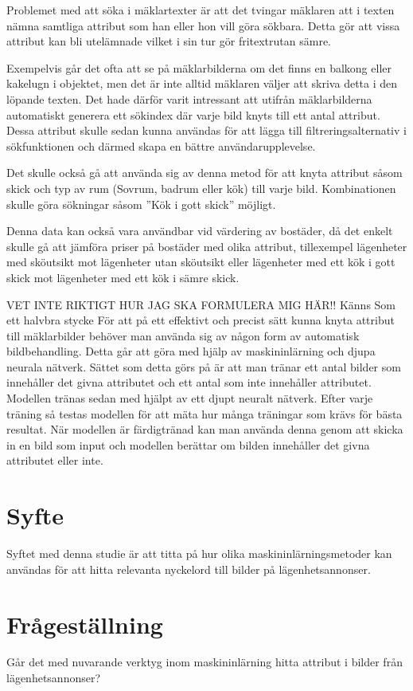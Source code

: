 \documentclass[]{kththesis}
\begin{document}
Problemet med att söka i mäklartexter är att det tvingar mäklaren att i texten nämna samtliga attribut som han eller hon vill göra sökbara. 
Detta gör att vissa attribut kan bli utelämnade vilket i sin tur gör fritextrutan sämre.

Exempelvis går det ofta att se på mäklarbilderna om det finns en balkong eller kakelugn i objektet, men det är inte alltid mäklaren väljer att skriva detta i den löpande texten.
Det hade därför varit intressant att utifrån mäklarbilderna automatiskt generera ett sökindex där varje bild knyts till ett antal attribut.
Dessa attribut skulle sedan kunna användas för att lägga till filtreringsalternativ i sökfunktionen och därmed skapa en bättre användarupplevelse.

Det skulle också gå att använda sig av denna metod för att knyta attribut såsom skick och typ av rum (Sovrum, badrum eller kök) till varje bild.
Kombinationen skulle göra sökningar såsom ”Kök i gott skick” möjligt.  

Denna data kan också vara användbar vid värdering av bostäder, då det enkelt skulle gå att jämföra priser på bostäder med olika attribut, tillexempel lägenheter med sköutsikt mot lägenheter utan sköutsikt eller lägenheter med ett kök i gott skick mot lägenheter med ett kök i sämre skick.

VET INTE RIKTIGT HUR JAG SKA FORMULERA MIG HÄR!! Känns Som ett halvbra stycke
För att på ett effektivt och precist sätt kunna knyta attribut till mäklarbilder behöver man använda sig av någon form av automatisk bildbehandling.
Detta går att göra med hjälp av maskininlärning och djupa neurala nätverk.
Sättet som detta görs på är att man tränar ett antal bilder som innehåller det givna attributet och ett antal som inte innehåller attributet.
Modellen tränas sedan med hjälpt av ett djupt neuralt nätverk. 
Efter varje träning så testas modellen för att mäta hur många träningar som krävs för bästa resultat.
När modellen är färdigtränad kan man använda denna genom att skicka in en bild som input och modellen berättar om bilden innehåller det givna attributet eller inte.

\section{Syfte}
Syftet med denna studie är att titta på hur olika maskininlärningsmetoder kan användas för att hitta relevanta nyckelord till bilder på lägenhetsannonser. 

\section{Frågeställning}
Går det med nuvarande verktyg inom maskininlärning hitta attribut i bilder från lägenhetsannonser?
\end{document}
